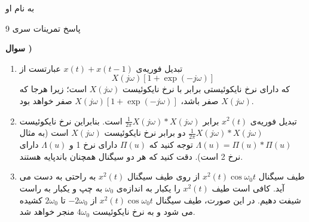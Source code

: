 \documentclass{article}
\newcounter{qnumber}
\newcommand{\Q}{
\textbf{سوال \theqnumber)}
\stepcounter{qnumber}
}
\begin{document}
\begin{center}
\Large

به نام او

پاسخ تمرینات سری 9
\end{center}

\hrulefill

\large

\Q

\begin{enumerate}[label=\alph*)]
\item
تبدیل فوریه‌ی
$
x(t)+x(t-1)
$
عبارتست از
$$
X(j\omega)[1+\exp(-j\omega)]
$$
که دارای نرخ نایکوئیستی برابر با نرخ نایکوئیست 
$
X(j\omega)
$
است؛ زیرا هرجا که $X(j\omega)$ صفر باشد، 
$
X(j\omega)[1+\exp(-j\omega)]
$
صفر خواهد بود.
\item
تبدیل فوریه‌ی
$
x^2(t)
$
برابر
$
\frac{1}{2\pi}X(j\omega)*X(j\omega)
$
است. بنابراین نرخ نایکوئیست 
$
\frac{1}{2\pi}X(j\omega)*X(j\omega)
$
دو برابر نرخ نایکوئیست
$
X(j\omega)
$
است (به مثال 
$
\Lambda(u)=\Pi(u)*\Pi(u)
$
توجه کنید که 
$
\Pi(u)
$
دارای نرخ 1 و 
$
\Lambda(u)
$
دارای نرخ 2 است). دقت کنید که هر دو سیگنال همچنان باندپایه هستند.
\item
طیف سیگنال 
$
x^2(t)\cos\omega_0 t
$
از روی طیف سیگنال 
$
x^2(t)
$
به راحتی به دست می آید. کافی است طیف 
$
x^2(t)
$
را یکبار به اندازه‌ی $\omega_0$ به چپ و یکبار به راست شیفت دهیم. در این صورت، طیف سیگنال 
$
x^2(t)\cos\omega_0 t
$
از 
$
-2\omega_0
$
تا 
$
2\omega_0
$
کشیده می شود و به نرخ نایکوئیست 
$
4\omega_0
$
منجر خواهد شد.
\end{enumerate}
\end{document}
